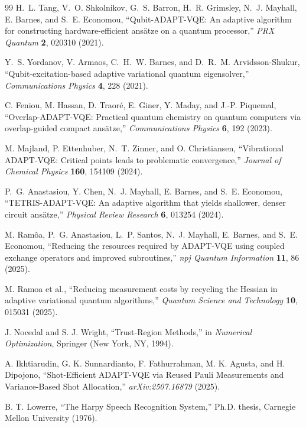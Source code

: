 \documentclass[
  reprint,
  amsmath,
  amssymb,
  aps,
  pra,
  nofootinbib,
  superscriptaddress,
  floatfix
]{revtex4-2}
\begin{document}
\begin{thebibliography}{99}
H.~L. Tang, V.~O. Shkolnikov, G.~S. Barron, H.~R. Grimsley, N.~J. Mayhall, E. Barnes, and S.~E. Economou,
``Qubit-ADAPT-VQE: An adaptive algorithm for constructing hardware-efficient ans\"atze on a quantum processor,''
\emph{PRX Quantum} \textbf{2}, 020310 (2021).

Y.~S. Yordanov, V. Armaos, C.~H.~W. Barnes, and D.~R.~M. Arvidsson-Shukur,
``Qubit-excitation-based adaptive variational quantum eigensolver,''
\emph{Communications Physics} \textbf{4}, 228 (2021).

C. Feniou, M. Hassan, D. Traor\'e, E. Giner, Y. Maday, and J.-P. Piquemal,
``Overlap-ADAPT-VQE: Practical quantum chemistry on quantum computers via overlap-guided compact ans\"atze,''
\emph{Communications Physics} \textbf{6}, 192 (2023).

M. Majland, P. Ettenhuber, N.~T. Zinner, and O. Christiansen,
``Vibrational ADAPT-VQE: Critical points leads to problematic convergence,''
\emph{Journal of Chemical Physics} \textbf{160}, 154109 (2024).

P.~G. Anastasiou, Y. Chen, N.~J. Mayhall, E. Barnes, and S.~E. Economou,
``TETRIS-ADAPT-VQE: An adaptive algorithm that yields shallower, denser circuit ans\"atze,''
\emph{Physical Review Research} \textbf{6}, 013254 (2024).

M. Ram\^oa, P.~G. Anastasiou, L.~P. Santos, N.~J. Mayhall, E. Barnes, and S.~E. Economou,
``Reducing the resources required by ADAPT-VQE using coupled exchange operators and improved subroutines,''
\emph{npj Quantum Information} \textbf{11}, 86 (2025).

M. Ramoa et al.,
``Reducing measurement costs by recycling the Hessian in adaptive variational quantum algorithms,''
\emph{Quantum Science and Technology} \textbf{10}, 015031 (2025).

J. Nocedal and S. J. Wright,
``Trust-Region Methods,''
in \emph{Numerical Optimization}, Springer (New York, NY, 1994).

A. Ikhtiarudin, G. K. Sunnardianto, F. Fathurrahman, M. K. Agusta, and H. Dipojono,
``Shot-Efficient ADAPT-VQE via Reused Pauli Measurements and Variance-Based Shot Allocation,''
\emph{arXiv:2507.16879} (2025).

B. T. Lowerre,
``The Harpy Speech Recognition System,''
Ph.D. thesis, Carnegie Mellon University (1976).


\end{thebibliography}
\end{document}

